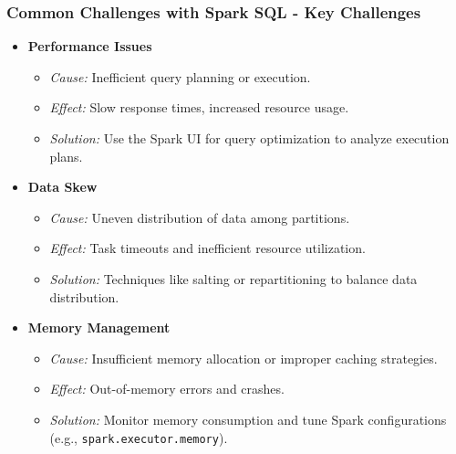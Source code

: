 \documentclass[aspectratio=169]{beamer}
\begin{document}
\begin{frame}[fragile]
    \frametitle{Common Challenges with Spark SQL - Key Challenges}
    \begin{itemize}
        \item \textbf{Performance Issues}
        \begin{itemize}
            \item \textit{Cause:} Inefficient query planning or execution.
            \item \textit{Effect:} Slow response times, increased resource usage.
            \item \textit{Solution:} Use the Spark UI for query optimization to analyze execution plans.
        \end{itemize}
        
        \item \textbf{Data Skew}
        \begin{itemize}
            \item \textit{Cause:} Uneven distribution of data among partitions.
            \item \textit{Effect:} Task timeouts and inefficient resource utilization.
            \item \textit{Solution:} Techniques like salting or repartitioning to balance data distribution.
        \end{itemize}
        
        \item \textbf{Memory Management}
        \begin{itemize}
            \item \textit{Cause:} Insufficient memory allocation or improper caching strategies.
            \item \textit{Effect:} Out-of-memory errors and crashes.
            \item \textit{Solution:} Monitor memory consumption and tune Spark configurations (e.g., \texttt{spark.executor.memory}).
        \end{itemize}
    \end{itemize}
\end{frame}
\end{document}
